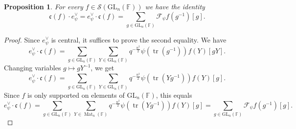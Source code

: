 \documentclass[12pt, reqno]{amsart}
\newtheorem{proposition}[theorem]{Proposition}
\theoremstyle{definition}
\newcommand{\fieldCharacter}{\psi}
\newcommand{\trace}{\operatorname{tr}}
\newcommand{\GL}{\mathrm{GL}}
\newcommand{\finiteField}{\mathbb{F}}
\newcommand{\squareMatrix}{\operatorname{Mat}}
\newcommand{\fourierTransform}[1]{\mathcal{F}_{#1}}
\newcommand{\Schwartz}{\mathcal{S}}
\newcommand{\algebraIsomorphism}{\mathfrak{c}}
\begin{document}
\begin{proposition}\label{prop:identity-in-the-group-algebra}
	For every $f \in \Schwartz\left(\GL_n\left(\finiteField\right)\right)$ we have the identity
	\begin{displaymath}
	\algebraIsomorphism\left(f\right) \cdot e^{\vee}_{\fieldCharacter} = e^{\vee}_{\fieldCharacter} \cdot \algebraIsomorphism\left(f\right) = \sum_{g \in \GL_n\left(\finiteField\right)} \fourierTransform{\fieldCharacter}f\left(g^{-1}\right) \left[g\right].
	\end{displaymath}
\end{proposition}
\begin{proof}
	Since $e_{\fieldCharacter}^{\vee}$ is central, it suffices to prove the second equality. We have
	\begin{displaymath}
	e^{\vee}_{\fieldCharacter} \cdot \algebraIsomorphism\left(f\right) = \sum_{g \in \GL_n\left(\finiteField\right)} \sum_{Y \in \GL_n\left(\finiteField\right)} q^{-\frac{n^2}{2}} \fieldCharacter\left(\trace\left(g^{-1}\right)\right) f\left(Y\right) \left[gY\right].
	\end{displaymath}
	Changing variables $g \mapsto g Y^{-1}$, we get
	\begin{displaymath}
	e^{\vee}_{\fieldCharacter} \cdot \algebraIsomorphism\left(f\right) = \sum_{g \in \GL_n\left(\finiteField\right)} \sum_{Y \in \GL_n\left(\finiteField\right)} q^{-\frac{n^2}{2}} \fieldCharacter\left(\trace\left(Y g^{-1}\right)\right) f\left(Y\right) \left[g\right].
	\end{displaymath}
	Since $f$ is only supported on elements of $\GL_n\left(\finiteField\right)$, this equals
	\begin{displaymath}
	e^{\vee}_{\fieldCharacter} \cdot \algebraIsomorphism\left(f\right) = \sum_{g \in \GL_n\left(\finiteField\right)} \sum_{Y \in \squareMatrix_n\left(\finiteField\right)} q^{-\frac{n^2}{2}} \fieldCharacter\left(\trace\left(Y g^{-1}\right)\right) f\left(Y\right) \left[g\right] = \sum_{g \in \GL_n\left(\finiteField\right)} \fourierTransform{\fieldCharacter}f\left(g^{-1}\right) \left[g\right].
	\end{displaymath}
\end{proof}
\end{document}
